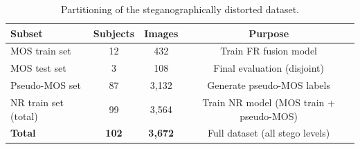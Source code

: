\begin{table}
\centering
\caption{Partitioning of the steganographically distorted dataset.}
\label{tab:dataset_partition}
\begin{tabular}{lccc}
\hline
\textbf{Subset}       & \textbf{Subjects} & \textbf{Images} & \textbf{Purpose} \\
\hline
MOS train set         & 12                & 432             & Train FR fusion model \\
MOS test set          & 3                 & 108             & Final evaluation (disjoint) \\
Pseudo-MOS set        & 87                & 3,132           & Generate pseudo-MOS labels \\
NR train set (total)  & 99                & 3,564           & Train NR model (MOS train + pseudo-MOS) \\
\hline
\textbf{Total}        & \textbf{102}      & \textbf{3,672}  & Full dataset (all stego levels) \\
\hline
\end{tabular}
\end{table}


